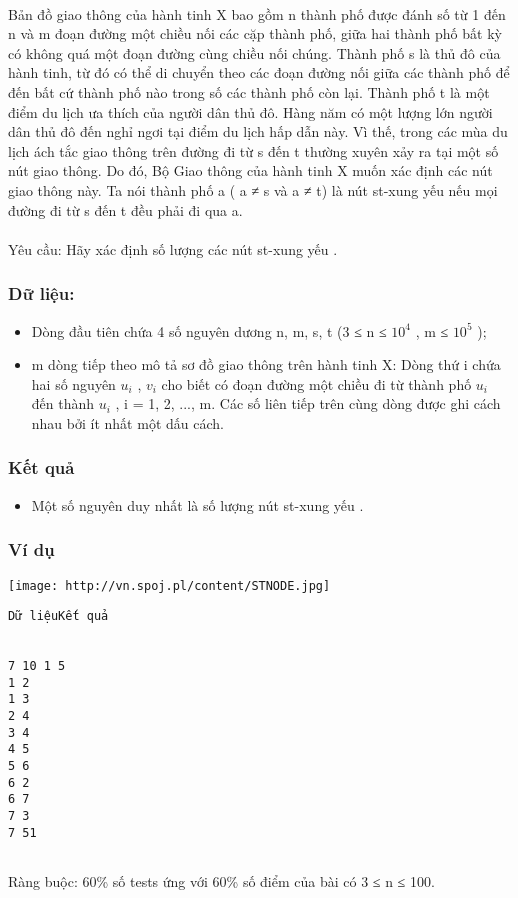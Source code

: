 

 

Bản đồ giao thông của hành tinh X bao gồm n thành phố được đánh số từ 1 đến n và m đoạn đường một chiều nối các cặp thành phố, giữa hai thành phố bất kỳ có không quá một đoạn đường cùng chiều nối chúng. Thành phố s là thủ đô của hành tinh, từ đó có thể di chuyển theo các đoạn đường nối giữa các thành phố để đến bất cứ thành phố nào trong số các thành phố còn lại. Thành phố t là một điểm du lịch ưa thích của người dân thủ đô. Hàng năm có một lượng lớn người dân thủ đô đến nghỉ ngơi tại điểm du lịch hấp dẫn này. Vì thế, trong các mùa du lịch ách tắc giao thông trên đường đi từ s đến t thường xuyên xảy ra tại một số nút giao thông. Do đó, Bộ Giao thông của hành tinh X muốn xác định các nút giao thông này. Ta nói thành phố a ( a ≠ s và a ≠ t) là nút st-xung yếu nếu mọi đường đi từ s đến t đều phải đi qua a.
\\
\\Yêu cầu: Hãy xác định số lượng các nút st-xung yếu .

\subsubsection{Dữ liệu:}
\begin{itemize}
	\item Dòng đầu tiên chứa 4 số nguyên dương n, m, s, t (3 ≤ n ≤ $10^{4}$ , m ≤ $10^{5}$ );
	\item m dòng tiếp theo mô tả sơ đồ giao thông trên hành tinh X: Dòng thứ i chứa hai số nguyên $u_{i}$ , $v_{i}$ cho biết có đoạn đường một chiều đi từ thành phố $u_{i}$ đến thành $u_{i}$ , i = 1, 2, ..., m. Các số liên tiếp trên cùng dòng được ghi cách nhau bởi ít nhất một dấu cách.
\end{itemize}

\subsubsection{Kết quả}
\begin{itemize}
	\item Một số nguyên duy nhất là số lượng nút st-xung yếu .
\end{itemize}

\subsubsection{Ví dụ}


\texttt{[image: http://vn.spoj.pl/content/STNODE.jpg]}
\begin{verbatim}
Dữ liệuKết quả


7 10 1 5
1 2
1 3
2 4
3 4
4 5
5 6
6 2
6 7
7 3
7 51


\end{verbatim}

Ràng buộc: 60\% số tests ứng với 60\% số điểm của bài có 3 ≤ n ≤ 100.

